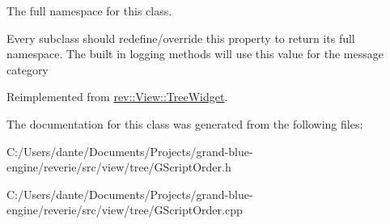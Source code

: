 The full namespace for this class. 

Every subclass should redefine/override this property to return its full namespace. The built in logging methods will use this value for the message category 

Reimplemented from \mbox{\hyperlink{classrev_1_1_view_1_1_tree_widget_a09be824e34e50e9622c3dc333c9a3c07}{rev\+::\+View\+::\+Tree\+Widget}}.



The documentation for this class was generated from the following files\+:\begin{DoxyCompactItemize}
\item 
C\+:/\+Users/dante/\+Documents/\+Projects/grand-\/blue-\/engine/reverie/src/view/tree/G\+Script\+Order.\+h\item 
C\+:/\+Users/dante/\+Documents/\+Projects/grand-\/blue-\/engine/reverie/src/view/tree/G\+Script\+Order.\+cpp\end{DoxyCompactItemize}
